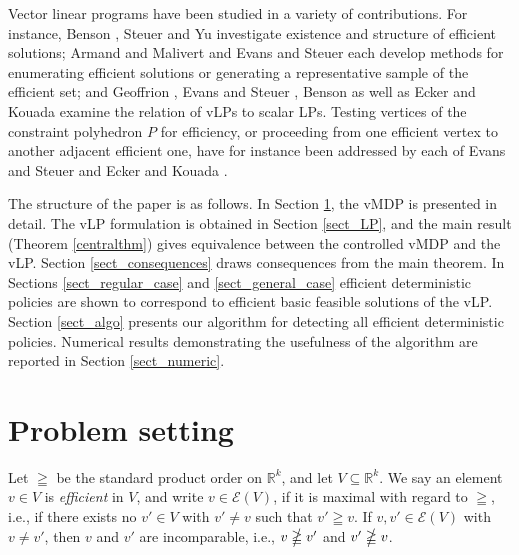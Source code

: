 \documentclass{article}
\theoremstyle{definition}
\numberwithin{equation}{section}
\begin{document}
{Vector linear programs have been studied in a variety of contributions. For instance, Benson 
\cite{2}, Steuer \cite{18} and Yu \cite{23}
investigate existence and structure of efficient solutions; Armand and Malivert
\cite{1} and Evans and Steuer \cite{7} each
develop methods for enumerating efficient solutions or generating a representative sample of the efficient set; and Geoffrion \cite{9}, Evans and Steuer \cite{7}, Benson \cite{2} as well as Ecker and Kouada \cite{6} examine the relation of vLPs to scalar LPs. 
Testing vertices of the constraint polyhedron $P$ for efficiency,
or proceeding from one efficient vertex to another adjacent efficient 
one,
have for instance been addressed
by each of Evans and Steuer \cite{7} and Ecker and Kouada \cite{6}.




The structure of the paper is as follows. 
In Section \ref{sect_problem}, the vMDP is presented in detail. The vLP formulation is obtained in Section \ref{sect_LP}, and
the main result (Theorem \ref{centralthm}) gives equivalence between the controlled vMDP 
and the vLP. Section \ref{sect_consequences} draws 
consequences from the main theorem. In Sections \ref{sect_regular_case} and \ref{sect_general_case}
efficient deterministic policies are shown to correspond to 
efficient basic feasible solutions of the vLP.
Section \ref{sect_algo} presents our algorithm for detecting all efficient deterministic policies. Numerical results demonstrating the usefulness of the algorithm are reported in Section \ref{sect_numeric}. 
\\

\section{Problem setting}
\label{sect_problem}
Let $\geqq$ be the standard product order on $\mathbb{R}^k$, 
and let $V \subseteq \mathbb{R}^k$. We say an element $v \in V$ is \textit{efficient} in $V$, and write $v \in \mathscr E(V)$, if it is maximal with regard to $\geqq$, i.e., if
there exists no $v' \in V$ with $v'\not= v$ such that $v' \geqq v$. If $v, v'\in \mathscr E(V)$ with $v\not= v'$, 
then $v$ and $v'$ are incomparable, i.e., $v \ngeqq v'$ and $v' \ngeqq v$. 

}
\end{document}
